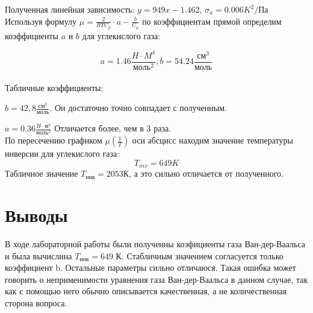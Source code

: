\documentclass[a4paper,12pt]{article} %
\begin{document}
\begin{enumerate}
Полученная линейная зависимость: $y =  949x - 1.462$,
$\sigma_a = 0.006 K^2/Па$\\


Используя формулу $\mu = \frac{2}{RTC_p} \cdot a  -  \frac{b}{C_p}$ по коэффициентам прямой определим коэффициенты $a$ и $b$ для углекислого газа:

$$a = 1.46 \frac{H \cdot M^4}{моль^2}, b = 54.24 \frac{см^3}{моль}$$ \\

Табличные коэффициенты: 

$b = 42,8 \frac{см^3}{моль}$. Он достаточно точно совпадает с полученным. 

$a = 0.36 \frac{H \cdot м^4}{моль^2}$ Отличается более, чем в 3 раза.\\

По пересечению графиком $\mu \left(\frac{1}{T}\right)$ оси абсцисс находим значение температуры
инверсии для углекислого газа:
$$T_{inv} = 649 K$$
Табличное значение $T_{инв} = 2053К$, а это сильно отличается от полученного.\\


\end{enumerate}


\section{Выводы}
		 В ходе лабораторной работы были полученны коэфициенты газа Ван-дер-Ваальса и была вычислина $T_{инв}= 649$ К. Стабличным значением  согласуется только коэффициент b. Остальные параметры сильно отличаюся. Такая ошибка может говорить о неприменимости уравнения газа Ван-дер-Ваальса в данном случае, так как с помощью него обычно описывается качественная, а не количественная сторона вопроса.
\end{document}
